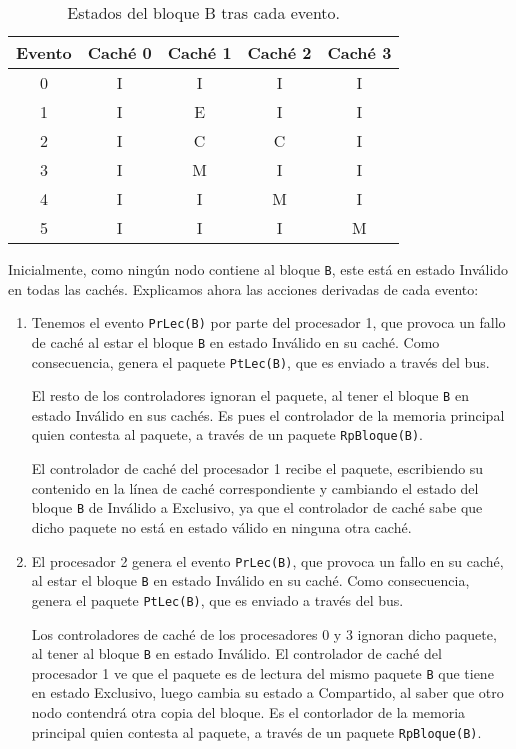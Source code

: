 \begin{ejercicio}
\begin{table}[H]
\centering
\begin{tabular}{c|c|c|c|c}
    Evento & Caché 0 & Caché 1 & Caché 2 & Caché 3 \\
    \hline
    0 & I & I & I & I \\
    \hline
    1 & I & E & I & I \\
    \hline
    2 & I & C & C & I \\
    \hline
    3 & I & M & I & I \\
    \hline
    4 & I & I & M & I \\
    \hline
    5 & I & I & I & M \\
\end{tabular}
\caption{Estados del bloque B tras cada evento.}
\label{tab:ej_rel3_1}
\end{table}
Inicialmente, como ningún nodo contiene al bloque \verb|B|, este está en estado Inválido en todas las cachés. Explicamos ahora las acciones derivadas de cada evento:
\begin{enumerate}
    \item Tenemos el evento \verb|PrLec(B)| por parte del procesador 1, que provoca un fallo de caché al estar el bloque \verb|B| en estado Inválido en su caché. Como consecuencia, genera el paquete \verb|PtLec(B)|, que es enviado a través del bus.

        El resto de los controladores ignoran el paquete, al tener el bloque \verb|B| en estado Inválido en sus cachés. Es pues el controlador de la memoria principal quien contesta al paquete, a través de un paquete \verb|RpBloque(B)|.

        El controlador de caché del procesador 1 recibe el paquete, escribiendo su contenido en la línea de caché correspondiente y cambiando el estado del bloque \verb|B| de Inválido a Exclusivo, ya que el controlador de caché sabe que dicho paquete no está en estado válido en ninguna otra caché.

    \item El procesador 2 genera el evento \verb|PrLec(B)|, que provoca un fallo en su caché, al estar el bloque \verb|B| en estado Inválido en su caché. Como consecuencia, genera el paquete \verb|PtLec(B)|, que es enviado a través del bus.

        Los controladores de caché de los procesadores 0 y 3 ignoran dicho paquete, al tener al bloque \verb|B| en estado Inválido. El controlador de caché del procesador 1 ve que el paquete es de lectura del mismo paquete \verb|B| que tiene en estado Exclusivo, luego cambia su estado a Compartido, al saber que otro nodo contendrá otra copia del bloque. Es el contorlador de la memoria principal quien contesta al paquete, a través de un paquete \verb|RpBloque(B)|.


\end{enumerate}
\end{ejercicio}
